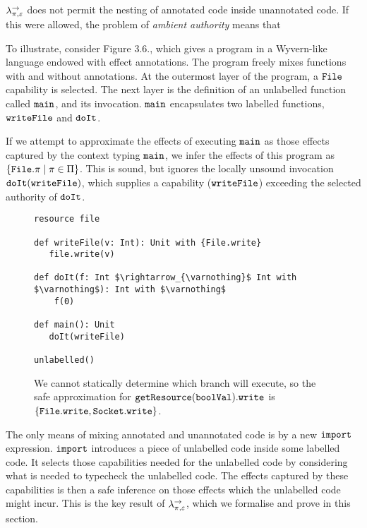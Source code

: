 $\lambda^{\rightarrow}_{\pi, \varepsilon}$ does not permit the nesting of annotated code inside unannotated code. If this were allowed, the problem of \textit{ambient authority} means that

To illustrate, consider Figure 3.6., which gives a program in a Wyvern-like language endowed with effect annotations. The program freely mixes functions with and without annotations. At the outermost layer of the program, a $\mathtt{File}$ capability is selected. The next layer is the definition of an unlabelled function called $\mathtt{main}$, and its invocation. $\mathtt{main}$ encapsulates two labelled functions, $\mathtt{writeFile}$ and $\mathtt{doIt}$.

If we attempt to approximate the effects of executing $\mathtt{main}$ as those effects captured by the context typing $\mathtt{main}$, we infer the effects of this program as $\{ \mathtt{File}.\pi \mid \pi \in \Pi \}$. This is sound, but ignores the locally unsound invocation $\mathtt{doIt(writeFile)}$, which supplies a capability ($\mathtt{writeFile}$) exceeding the selected authority of $\mathtt{doIt}$.


\begin{figure}[h]

\begin{lstlisting}
resource file

def writeFile(v: Int): Unit with {File.write}
   file.write(v)
   
def doIt(f: Int $\rightarrow_{\varnothing}$ Int with $\varnothing$): Int with $\varnothing$
    f(0)

def main(): Unit
   doIt(writeFile)
   
unlabelled()

\end{lstlisting}
\vspace{-7pt}
\caption{We cannot statically determine which branch will execute, so the safe approximation for $\mathtt{getResource(boolVal).write}$ is $\{ \mathtt{File.write, Socket.write} \}$.}
\label{This is the label.}
\end{figure}


The only means of mixing annotated and unannotated code is by a new $\mathtt{import}$ expression. $\mathtt{import}$ introduces a piece of unlabelled code inside some labelled code. It selects those capabilities needed for the unlabelled code by considering what is needed to typecheck the unlabelled code. The effects captured by these capabilities is then a safe inference on those effects which the unlabelled code might incur. This is the key result of $\lambda^{\rightarrow}_{\pi, \varepsilon}$, which we formalise and prove in this section.

